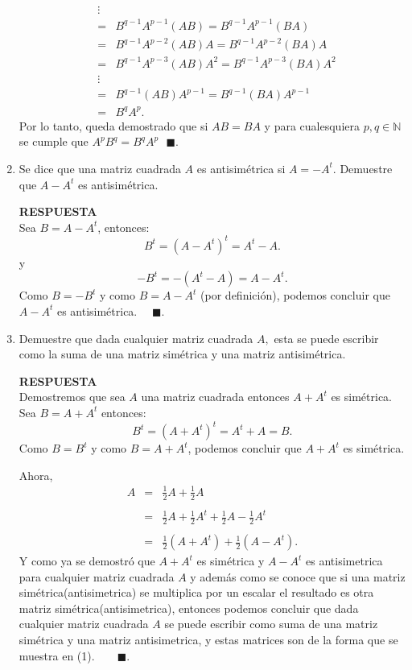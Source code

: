 \documentclass[11pt,letterpaper]{article}
\newcommand{\res}{\textbf{RESPUESTA}\\}
\newcommand{\fin}{$\blacksquare.$}
\newcommand{\finf}{\blacksquare.}
\begin{document}
\begin{enumerate}
\begin{equation*}
\begin{array}{ccc}
&\vdots&\\
&=&B^{q-1}A^{p-1}(AB)=B^{q-1}A^{p-1}(BA)\\
&=&B^{q-1}A^{p-2}(AB)A=B^{q-1}A^{p-2}(BA)A\\
&=&B^{q-1}A^{p-3}(AB)A^2=B^{q-1}A^{p-3}(BA)A^2\\
&\vdots&\\
&=&B^{q-1}(AB)A^{p-1}=B^{q-1}(BA)A^{p-1}\\
&=&B^qA^{p}.
\end{array}
\end{equation*}
Por lo tanto, queda demostrado que si $AB=BA$ y para cualesquiera $p,q\in \mathbb{N}$ se cumple que $A^pB^q=B^qA^p \ \ \ \finf$ 
\item Se dice que una matriz cuadrada $A$ es antisimétrica si $A=-A^t.$ Demuestre que $A-A^t$ es antisimétrica.

\res
Sea $B=A-A^t$, entonces:
$$B^t=(A-A^t)^t=A^t-A.$$
y $$-B^t=-(A^t-A)=A-A^t.$$
Como $B=-B^t$ y como $B=A-A^t$ (por definición), podemos concluir que   $A-A^t$ es antisimétrica. \ \ \fin

\item Demuestre que dada cualquier matriz cuadrada $A,$ esta se puede escribir como la suma de una matriz simétrica y una matriz antisimétrica.

\res
Demostremos que sea $A$ una matriz cuadrada entonces $A+A^t$ es simétrica. Sea $B=A+A^t$ entonces:
$$B^t=(A+A^t)^t=A^t+A=B.$$
Como $B=B^t$ y como $B=A+A^t$, podemos concluir que $A+A^t$ es simétrica. 

Ahora,
\begin{equation}
\begin{array}{ccc}
A&=&\frac{1}{2}A+\frac{1}{2}A\\
&&\\
&=&\frac{1}{2}A+\frac{1}{2}A^t+\frac{1}{2}A-\frac{1}{2}A^t\\
&&\\
&=&\frac{1}{2}(A+A^t)+\frac{1}{2}(A-A^t). 
\end{array}
\end{equation}	
Y como ya se demostró que $A+A^t$ es simétrica y $A-A^t$ es antisimetrica para cualquier matriz cuadrada $A$ y además como se conoce que si una matriz simétrica(antisimetrica) se multiplica por un escalar el resultado es otra matriz simétrica(antisimetrica), entonces podemos concluir que dada cualquier matriz cuadrada $A$ se puede escribir como suma de una matriz simétrica y una matriz antisimetrica, y estas matrices son de la forma que se muestra en (1).\ \ \ \ \fin 


\end{enumerate}
\end{document}
